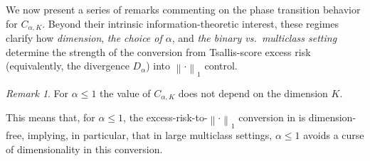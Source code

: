 \documentclass[11pt,oneside,a4paper]{article}
\newcommand{\lno}[1]{\left\lVert#1\right\rVert}
\theoremstyle{plain}
\theoremstyle{definition}
\theoremstyle{remark}
\newtheorem{remark}[theorem]{Remark}
\begin{document}
We now present a series of remarks commenting on the phase transition behavior for $C_{\alpha,K}$.
Beyond their intrinsic information-theoretic interest, these regimes clarify how \emph{dimension}, \emph{the choice of $\alpha$}, and \emph{the binary vs.\ multiclass setting} determine the strength of the conversion from Tsallis-score excess risk (equivalently, the divergence $D_\alpha$) into $\lno{\cdot}_1$ control.
\begin{remark}
For $\alpha \le 1$ the value of $C_{\alpha, K}$ does not depend on the dimension $K$.
\end{remark}
This means that, for $\alpha \le 1$, the excess-risk-to-$\lno{\cdot}_1$ conversion in  is dimension-free, implying, in particular, that in large multiclass settings, $\alpha \le 1$ avoids a curse of dimensionality in this conversion.
\end{document}
